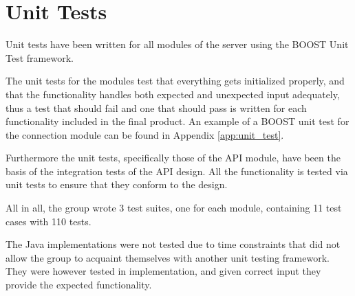 \section{Unit Tests}
Unit tests have been written for all modules of the server using the BOOST Unit Test framework. 

The unit tests for the modules test that everything gets initialized properly, and that the functionality handles both expected and unexpected input adequately, thus a test that should fail and one that should pass is written for each functionality included in the final product. An example of a BOOST unit test for the connection module can be found in Appendix \autoref{app:unit_test}.

Furthermore the unit tests, specifically those of the API module, have been the basis of the integration tests of the API design. All the functionality is tested via unit tests to ensure that they conform to the design.

All in all, the group wrote 3 test suites, one for each module, containing 11 test cases with 110 tests. 

The Java implementations were not tested due to time constraints that did not allow the group to acquaint themselves with another unit testing framework. They were however tested in implementation, and given correct input they provide the expected functionality.
